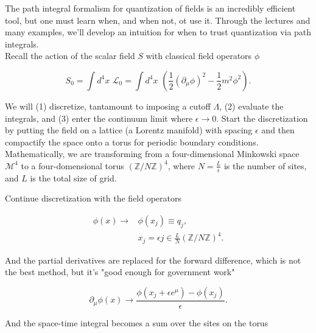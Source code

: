 \noindent The path integral formalism for quantization of fields is an incredibly efficient tool, but one must learn when, and when not, ot use it. Through the lectures and many examples, we'll develop an intuition for when to trust quantization via path integrals. \\

\noindent Recall the action of the scalar field $S$ with classical field operators $\phi$

\begin{equation}
S_0 = \int d^4 x \,\, \mathcal{L}_0 = \int d^4 x \,\, \left( \frac{1}{2} (\partial_\mu \phi)^2 - \frac{1}{2} m^2 \phi^2 \right).
\end{equation}

\noindent We will (1) discretize, tantamount to imposing a cutoff $\Lambda$, (2) evaluate the integrals, and (3) enter the continuum limit where $\epsilon \rightarrow 0$. Start the discretization by putting the field on a lattice (a Lorentz manifold) with spacing $\epsilon$ and then compactify the space onto a torus for periodic boundary conditions.  \\

\noindent Mathematically, we are transforming from a four-dimensional Minkowski space $\mathcal{M}^4$ to a four-domensional torus $(\mathbb{Z}/N\mathbb{Z})^4$, where $N = \frac{L}{\epsilon}$ is the number of sites, and $L$ is the total size of grid.


\noindent Continue discretization with the field operators

\begin{align}
\phi(x) \rightarrow &\phi(x_j) \equiv q_j, \\
&x_j=\epsilon j \in \frac{L}{N} (\mathbb{Z}/N\mathbb{Z})^4.
\end{align}

\noindent And the partial derivatives are replaced for the forward difference, which is not the best method, but it's "good enough for government work"

\begin{equation}
\partial_\mu \phi (x) \rightarrow \frac{\phi(x_j + \epsilon e^\mu) - \phi(x_j)}{\epsilon}.
\end{equation}

\noindent And the space-time integral becomes a sum over the sites on the torus

